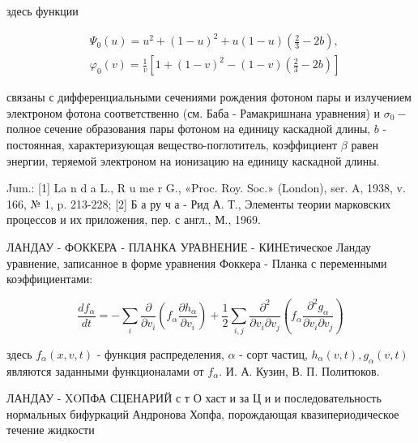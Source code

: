 \documentclass[10pt]{article}
\begin{document}
здесь функции



\[

\begin{aligned}

& \Psi_{0}(u)=u^{2}+(1-u)^{2}+u(1-u)\left(\frac{2}{3}-2 b\right), \\

& \varphi_{0}(v)=\frac{1}{v}\left[1+(1-v)^{2}-(1-v)\left(\frac{2}{3}-2 b\right)\right]

\end{aligned}

\]



связаны с дифференциальными сечениями рождения фотоном пары и излучением электроном фотона соответственно (см. Баба - Рамакришнана уравнения) и $\sigma_{0}-$ полное сечение образования пары фотоном на единицу каскадной длины, $b$ - постоянная, характеризующая вещество-поглотитель, коэффициент $\beta$ равен энергии, теряемой электроном на ионизацию на единицу каскадной длины.



Jum.: [1] La n d a L., R u me r G., «Proc. Roy. Soc.» (London), ser. A, 1938, v. 166, № 1, p. 213-228; [2] Б а ру ч а - Рид А. Т., Элементы теории марковских процессов и их приложения, пер. с англ., М., 1969.



ЛАНДАУ - ФОККЕРА - ПЛАНКА УРАВНЕНИЕ - КИНЕтическое Ландау уравнение, записанное в форме уравнения Фоккера - Планка с переменными коэффициентами:



\[

\frac{d f_{\alpha}}{d t}=-\sum_{i} \frac{\partial}{\partial v_{i}}\left(f_{\alpha} \frac{\partial h_{\alpha}}{\partial v_{i}}\right)+\frac{1}{2} \sum_{i, j} \frac{\partial^{2}}{\partial v_{i} \partial v_{j}}\left(f_{\alpha} \frac{\partial^{2} g_{\alpha}}{\partial v_{i} \partial v_{j}}\right)

\]



здесь $f_{\alpha}(x, v, t)$ - функция распределения, $\alpha$ - сорт частиц, $h_{\alpha}(v, t), g_{\alpha}(v, t)$ являются заданными функционалами от $f_{\alpha}$. И. А. Кузин, В. П. Политюков.



ЛАНДАУ - XOПФА СЦЕНАРИЙ с т О хаст и за Ц и и последовательность нормальных бифуркаций Андронова Хопфа, порождающая квазипериодическое течение жидкости
\end{document}
